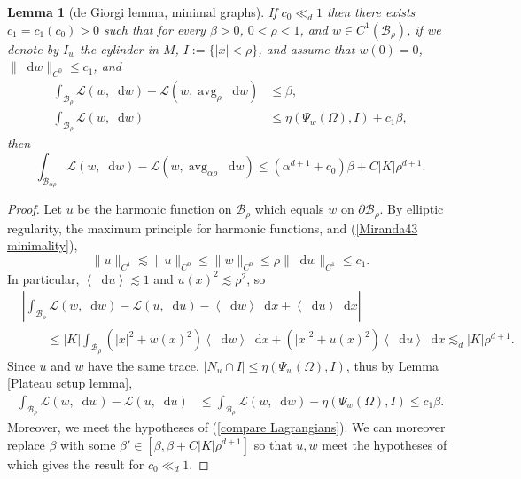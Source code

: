 \documentclass[reqno,11pt]{amsart}
\DeclareMathOperator{\avg}{avg}
\newcommand*\dif{\mathop{}\!\mathrm{d}}
\newcommand{\Lagrange}{\mathscr L}
\def\Japan#1{\left \langle #1 \right \rangle}
\newtheorem{lemma}[theorem]{Lemma}
\theoremstyle{definition}
\numberwithin{equation}{section}
\begin{document}
\begin{lemma}[de Giorgi lemma, minimal graphs]\label{Miranda43}
If $c_0 \ll_d 1$ then there exists $c_1 = c_1(c_0) > 0$ such that for every $\beta > 0$, $0 < \rho < 1$, and $w \in C^1(\mathscr B_\rho)$, if we denote by
$I_w$ the cylinder in $M$, $I := \{|x| < \rho\}$, and assume that $w(0) = 0$, $\|\dif w\|_{C^0} \leq c_1$, and
\begin{align}
\int_{\mathscr B_\rho} \Lagrange(w, \dif w) - \Lagrange(w, \avg_\rho \dif w) &\leq \beta \label{Miranda43 oscillation}, \\
\int_{\mathscr B_\rho} \Lagrange(w, \dif w) &\leq \eta(\Psi_w(\Omega), I) + c_1 \beta \label{Miranda43 minimality},
\end{align}
then
\begin{equation}\label{Miranda43 concl}
\int_{\mathscr B_{\alpha \rho}} \Lagrange(w, \dif w) - \Lagrange(w, \avg_{\alpha \rho} \dif w) \leq (\alpha^{d + 1} + c_0) \beta + C|K|\rho^{d + 1}.
\end{equation}
\end{lemma}
\begin{proof}
Let $u$ be the harmonic function on $\mathscr B_\rho$ which equals $w$ on $\partial \mathscr B_\rho$.
By elliptic regularity, the maximum principle for harmonic functions, and (\ref{Miranda43 minimality}),
$$\|u\|_{C^1} \lesssim \|u\|_{C^0} \leq \|w\|_{C^0} \leq \rho \|\dif w\|_{C^1} \leq c_1.$$
In particular, $\Japan{\dif u} \lesssim 1$ and $u(x)^2 \lesssim \rho^2$, so
\begin{align*}
&\left|\int_{\mathscr B_\rho} \Lagrange(w, \dif w) - \Lagrange(u, \dif u) - \Japan{\dif w} \dif x + \Japan{\dif u} \dif x\right| \\
&\qquad \leq |K| \int_{\mathscr B_\rho} (|x|^2 + w(x)^2) \Japan{\dif w} \dif x + (|x|^2 + u(x)^2) \Japan{\dif u} \dif x
\lesssim_d |K| \rho^{d + 1}.
\end{align*}
Since $u$ and $w$ have the same trace, $|N_u \cap I| \leq \eta(\Psi_w(\Omega), I)$, thus by Lemma \ref{Plateau setup lemma},
\begin{align*}
\int_{\mathscr B_\rho} \Lagrange(w, \dif w) - \Lagrange(u, \dif u) &\leq \int_{\mathscr B_\rho} \Lagrange(w, \dif w) - \eta(\Psi_w(\Omega), I) \leq c_1 \beta.
\end{align*}
Moreover, we meet the hypotheses of (\ref{compare Lagrangians}).
We can moreover replace $\beta$ with some $\beta' \in [\beta, \beta + C|K|\rho^{d + 1}]$ so that $u, w$ meet the hypotheses of \cite[Lemma 6.2]{Giusti77} which gives the result for $c_0 \ll_d 1$.
\end{proof}
\end{document}
